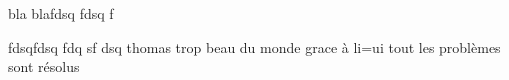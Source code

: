 bla blafdsq fdsq f

fdsqfdsq fdq
sf
dsq 
thomas trop beau du monde grace à li=ui tout les problèmes sont résolus 

\cite[text]{keylist}